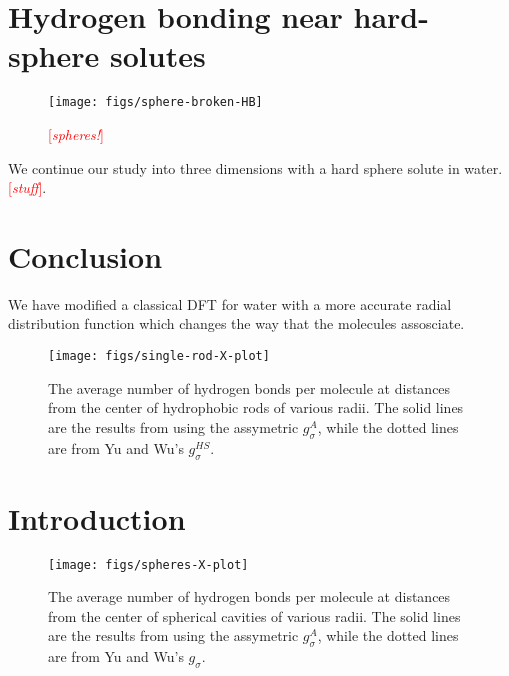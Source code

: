 \documentclass[twocolumn,amsmath,amssymb,prl]{revtex4-1}
\newcommand{\fixme}[1]{\textcolor{red}{[\emph{#1}]}}
\begin{document}
\section{Hydrogen bonding near hard-sphere solutes}

\begin{figure}
\begin{center}
\texttt{[image: figs/sphere-broken-HB]}
\end{center}
\caption{ \fixme{spheres!}}
\label{fig:spheres-broken-HB}
\end{figure}

We continue our study into three dimensions with a hard sphere solute
in water.\fixme{stuff}.

\section{Conclusion}

We have modified a classical DFT for water with a more accurate radial
distribution function which changes the way that the molecules assosciate.

\clearpage
  
\begin{figure}
\begin{center}
\texttt{[image: figs/single-rod-X-plot]}
\end{center}
\caption{ The average number of hydrogen bonds per molecule at
  distances from the center of hydrophobic rods of various
  radii. The solid lines are the results from using the assymetric
  $g_{\sigma}^A$, while the dotted lines are from Yu and Wu's $g_{\sigma}^{HS}$.}
\label{fig:single-rod-X}
\end{figure}
\section{Introduction}

\begin{figure}
\begin{center}
\texttt{[image: figs/spheres-X-plot]}
\end{center}
\caption{ The average number of hydrogen bonds per molecule at
  distances from the center of spherical cavities of various
  radii. The solid lines are the results from using the assymetric
  $g_{\sigma}^A$, while the dotted lines are from Yu and Wu's $g_{\sigma}$.}
\label{fig:spheres-X}
\end{figure}
\end{document}
